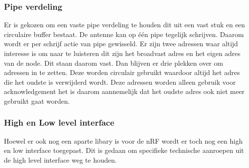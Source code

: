 \documentclass[a4paper, 11pt, oneside]{report}
\begin{document}
\subsubsection{Pipe verdeling}
Er is gekozen om een vaste pipe verdeling te houden dit uit een vast stuk en een circulaire buffer bestaat.
De antenne kan op één pipe tegelijk schrijven. 
Daarom wordt er per schrijf actie van pipe gewisseld.
Er zijn twee adressen waar altijd interesse is om naar te luisteren dit zijn het broadvast adres en het eigen adres van de node.
Dit staan daarom vast. 
Dan blijven er drie plekken over om adressen in te zetten. 
Deze worden circulair gebruikt waardoor altijd het adres die het oudste is verwijderd wordt.
Deze adressen worden alleen gebruik voor acknowledgement het is daarom aannemelijk dat het oudste adres ook niet meer gebruikt gaat worden.

\subsubsection{High en Low level interface}
Hoewel er ook nog een aparte libary is voor de nRF wordt er toch nog een high en low interface toegepast. 
Dit is gedaan om specifieke technische aanroepen uit de high level interface weg te houden.




\clearpage
\appendix
\end{document}
